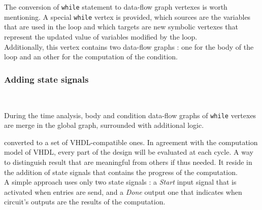\documentclass[10pt,a4paper]{article}
\newcommand{\code}{\texttt}
\renewcommand{\indent}{~\\\vspace{-.8cm}}
\begin{document}
The conversion of \code {while} statement to data-flow graph vertexes is worth mentioning. A special \code {while} vertex is provided, which sources are the variables that are used in the loop and which targets are new symbolic vertexes that represent the updated value of variables modified by the loop.\\

Additionally, this vertex contains two data-flow graphs : one for the body of the loop and an other for the computation of the condition.\\


\subsubsection{Adding state signals} \indent

During the time analysis, body and condition data-flow graphs of \code {while} vertexes are merge in the global graph, surrounded with additional logic.

converted to a set of VHDL-compatible ones.
In agreement with the computation model of VHDL, every part of the design will be evaluated at each cycle. A way to distinguish result that are meaningful from others if thus needed. It reside in the addition of state signals that contains the progress of the computation.\\


A simple approach uses only two state signals : a \textit{Start} input signal that is activated when entries are send, and a \textit{Done} output one that indicates when circuit's outputs are the results of the computation.
\end{document}
